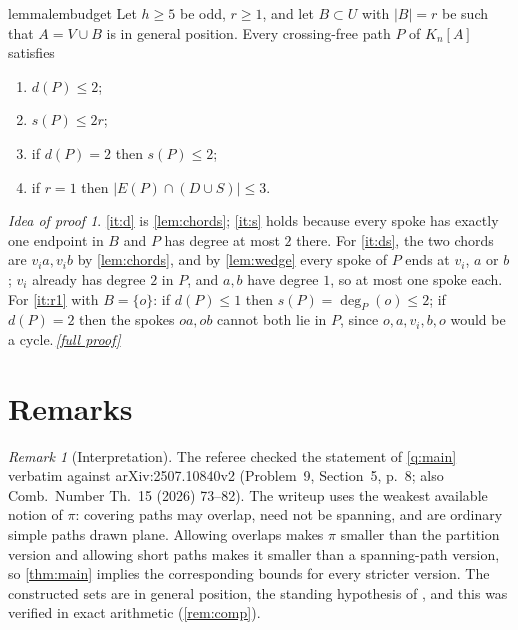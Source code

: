 \documentclass[11pt,a4paper]{article}
\theoremstyle{plain}
\theoremstyle{definition}
\theoremstyle{remark}
\newtheorem{remark}[theorem]{Remark}
\newtheorem*{proofidea}{Idea of proof}
\newcommand{\fullproofref}[1]{\,\hyperref[#1]{\textit{[full proof]}}}
\newcommand{\pipath}{\pi}
\newcommand{\dP}{d}
\newcommand{\sP}{s}
\begin{document}
\begin{restatable}{lemma}{lembudget}\label{lem:budget}
Let $h\ge5$ be odd, $r\ge1$, and let $B\subset U$ with $|B|=r$ be such that $A=V\cup B$ is in general position. Every crossing-free path $P$ of $K_n[A]$ satisfies
\begin{enumerate}[label=(\roman*),leftmargin=2.2em]
\item\label{it:d} $\dP(P)\le2$;
\item\label{it:s} $\sP(P)\le2r$;
\item\label{it:ds} if $\dP(P)=2$ then $\sP(P)\le2$;
\item\label{it:r1} if $r=1$ then $|E(P)\cap(D\cup S)|\le3$.
\end{enumerate}
\end{restatable}
\begin{proofidea}
\ref{it:d} is \cref{lem:chords}; \ref{it:s} holds because every spoke has exactly one endpoint in $B$ and $P$ has degree at most $2$ there. For \ref{it:ds}, the two chords are $v_ia,v_ib$ by \cref{lem:chords}, and by \cref{lem:wedge} every spoke of $P$ ends at $v_i$, $a$ or $b$; $v_i$ already has degree $2$ in $P$, and $a,b$ have degree $1$, so at most one spoke each. For \ref{it:r1} with $B=\{o\}$: if $\dP(P)\le1$ then $\sP(P)=\deg_P(o)\le2$; if $\dP(P)=2$ then the spokes $oa,ob$ cannot both lie in $P$, since $o,a,v_i,b,o$ would be a cycle.\fullproofref{pf:budget}
\end{proofidea}

\section{Remarks}\label{sec:remarks}

\begin{remark}[Interpretation]\label{rem:interp}
The referee checked the statement of \cref{q:main} verbatim against arXiv:2507.10840v2 (Problem~9, Section~5, p.~8; also Comb.\ Number Th.\ 15 (2026) 73--82). The writeup uses the weakest available notion of $\pipath$: covering paths may overlap, need not be spanning, and are ordinary simple paths drawn plane. Allowing overlaps makes $\pipath$ smaller than the partition version and allowing short paths makes it smaller than a spanning-path version, so \cref{thm:main} implies the corresponding bounds for every stricter version. The constructed sets are in general position, the standing hypothesis of \cite{DPSS26}, and this was verified in exact arithmetic (\cref{rem:comp}).
\end{remark}
\end{document}
